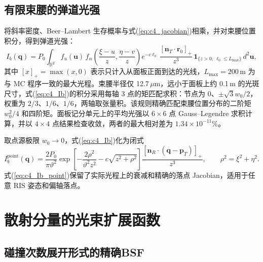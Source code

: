 \subsection{有限束腰的弹道光强}

将斜率密度、Beer--Lambert 生存概率与式(\ref{eq:c4_jacobian})相乘，并对束腰位置积分，得到弹道光强：
\begin{equation}
I_b(\mathbf q)=P_0\int_{\mathbb R^2}f_u(\mathbf u)\,
f_\alpha\!\left(\frac{\xi-u}{z},\frac{\eta-v}{z}\right)
e^{-c\ell_0}\,\frac{[\mathbf n_T\cdot\mathbf r_0]_+}{z^3}\,
\mathbf 1_{\{z>0,\ \ell_0\le L_{\max}\}}\,d^2\mathbf u,
\label{eq:c4_Ib}
\end{equation}
其中 $[x]_+=\max(x,0)$ 表示只计入从面板正面到达的光线，$L_{\max}=200\,\mathrm m$ 为与 MC 程序一致的最大光程。束腰半径仅 12.7\,$\mu$m，远小于面板上约 0.1\,m 的光斑尺寸，式(\ref{eq:c4_Ib})的积分采用每轴 3 点的矩匹配求积：节点为 $0$、$\pm\sqrt3w_0/2$，权重为 $2/3$、$1/6$、$1/6$，两轴取张量积。该规则精确匹配束腰位置分布的二阶矩 $w_0^2/4$ 和四阶矩。面板记分单元上的平均光强以 $6\times6$ 点 Gauss--Legendre 求积计算，并以 $4\times4$ 点结果检查收敛，两者的最大相对差为 $1.34\times10^{-11}\%$。

取点源极限 $w_0\to0$，式(\ref{eq:c4_Ib})化为闭式
\begin{equation}
I_b^{\mathrm{point}}(\mathbf q)=\frac{2P_0}{\pi\vartheta^2}
\exp\!\left[-\frac{2\rho^2}{\vartheta^2z^2}-c\sqrt{z^2+\rho^2}\right]
\frac{[\mathbf n_R\cdot(\mathbf q-\mathbf p_T)]_+}{z^3},\qquad \rho^2=\xi^2+\eta^2.
\label{eq:c4_Ib_point}
\end{equation}
式(\ref{eq:c4_Ib_point})保留了实际光程上的衰减和精确的落点 Jacobian，适用于任意 RIS 姿态和偏轴落点。

\section{散射分量的光束扩展函数}
\label{sec:c4_scatter}

\subsection{碰撞次数展开形式的精确BSF}

